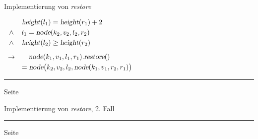 \documentclass{slides}
\newcounter{mypage}
\begin{document}

\begin{slide}{}
\normalsize

\begin{center}
Implementierung von \textsl{restore}
\end{center}
\vspace*{0.5cm}

\footnotesize
\vspace*{0.5cm}

$\begin{array}[t]{cl}
              & \textsl{height}(l_1) = \textsl{height}(r_1) + 2    \\[0.1cm] 
       \wedge & l_1 = \textsl{node}(k_2,v_2,l_2,r_2)               \\[0.1cm]
       \wedge & \textsl{height}(l_2) \geq \textsl{height}(r_2)     \\[0.3cm]
       \rightarrow & \quad \textsl{node}(k_1,v_1,l_1,r_1).\textsl{restore}() \\[0.1cm]
                   & = \textsl{node}\bigl(k_2,v_2,l_2,\textsl{node}(k_1,v_1,r_2,r_1)\bigr)
 \end{array}
$

\vspace*{\fill}
\tiny \addtocounter{mypage}{1}
\rule{17cm}{1mm}
 \hspace*{\fill} Seite 
\end{slide}


\begin{slide}{}
\normalsize

\begin{center}
Implementierung von \textsl{restore}, 2. Fall
\end{center}
\vspace*{0.5cm}
\footnotesize


\vspace*{\fill}
\tiny \addtocounter{mypage}{1}
\rule{17cm}{1mm}
 \hspace*{\fill} Seite 
\end{slide}

\end{document}
